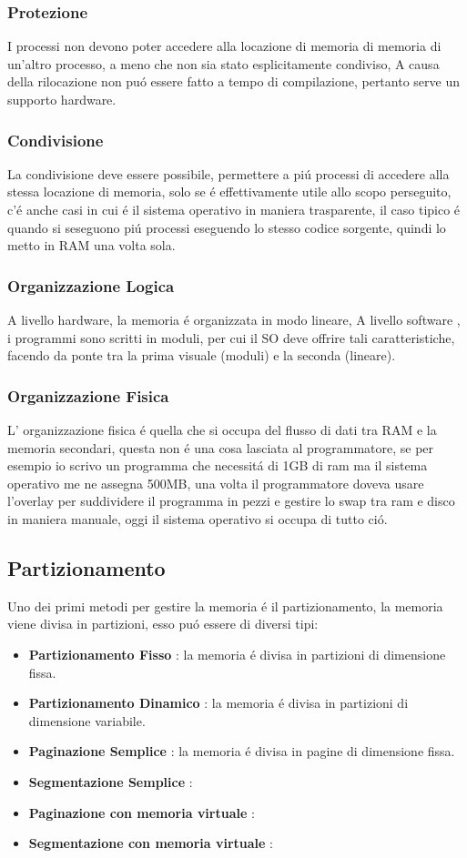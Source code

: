     \subsubsection{Protezione}
    I processi non devono poter accedere alla locazione di memoria di memoria di un'altro processo, a meno che
    non sia stato esplicitamente condiviso, A causa della rilocazione non puó essere fatto a tempo di compilazione,
    pertanto serve un supporto hardware.
    \subsubsection{Condivisione}
    La condivisione deve essere possibile, permettere a piú processi di accedere alla stessa locazione di memoria, solo se é effettivamente
    utile allo scopo perseguito, c'é anche casi in cui é il sistema operativo in maniera trasparente, il caso tipico é quando
    si seseguono piú processi eseguendo lo stesso codice sorgente, quindi lo metto in RAM una volta sola.
    \subsubsection{Organizzazione Logica}
    A livello hardware, la memoria é organizzata in modo lineare, A livello software , i programmi sono scritti in moduli,
    per cui il SO deve offrire tali caratteristiche, facendo da ponte tra la prima visuale (moduli) e la seconda (lineare).
    \subsubsection{Organizzazione Fisica}
    L' organizzazione fisica é quella che si occupa del flusso di dati tra RAM e la memoria secondari, questa non é una
    cosa lasciata al programmatore, se per esempio io scrivo un programma che necessitá di 1GB di ram ma il sistema
    operativo me ne assegna 500MB, una volta il programmatore doveva usare l'overlay per suddividere il programma in
    pezzi e gestire lo swap tra ram e disco in maniera manuale, oggi il sistema operativo si occupa di tutto ció.
    \subsection{Partizionamento}
    Uno dei primi metodi per gestire la memoria é il partizionamento, la memoria viene divisa in partizioni, esso
    puó essere di diversi tipi:
    \begin{itemize}
        \item \textbf{Partizionamento Fisso} : la memoria é divisa in partizioni di dimensione fissa.
        \item \textbf{Partizionamento Dinamico} : la memoria é divisa in partizioni di dimensione variabile.
        \item \textbf{Paginazione Semplice} : la memoria é divisa in pagine di dimensione fissa.
        \item \textbf{Segmentazione Semplice} :
        \item \textbf{Paginazione con memoria virtuale} :
        \item \textbf{Segmentazione con memoria virtuale} :
    \end{itemize}
